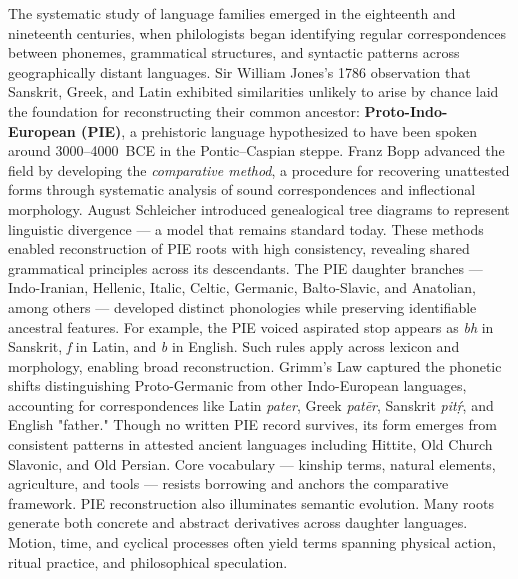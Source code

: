 \begin{historical}
    The systematic study of language families emerged in the eighteenth and nineteenth centuries, when philologists began identifying regular correspondences between phonemes, grammatical structures, and syntactic patterns across geographically distant languages. Sir William Jones's 1786 observation that Sanskrit, Greek, and Latin exhibited similarities unlikely to arise by chance laid the foundation for reconstructing their common ancestor: \textbf{Proto-Indo-European (PIE)}, a prehistoric language hypothesized to have been spoken around 3000–4000~BCE in the Pontic–Caspian steppe.
    Franz Bopp advanced the field by developing the \textit{comparative method}, a procedure for recovering unattested forms through systematic analysis of sound correspondences and inflectional morphology. August Schleicher introduced genealogical tree diagrams to represent linguistic divergence — a model that remains standard today. These methods enabled reconstruction of PIE roots with high consistency, revealing shared grammatical principles across its descendants.
    The PIE daughter branches — Indo-Iranian, Hellenic, Italic, Celtic, Germanic, Balto-Slavic, and Anatolian, among others — developed distinct phonologies while preserving identifiable ancestral features. For example, the PIE voiced aspirated stop  appears as \emph{bh} in Sanskrit, \emph{f} in Latin, and \emph{b} in English. Such rules apply across lexicon and morphology, enabling broad reconstruction. Grimm's Law captured the phonetic shifts distinguishing Proto-Germanic from other Indo-European languages, accounting for correspondences like Latin \emph{pater}, Greek \emph{patēr}, Sanskrit \emph{pitṛ́}, and English "father."
    Though no written PIE record survives, its form emerges from consistent patterns in attested ancient languages including Hittite, Old Church Slavonic, and Old Persian. Core vocabulary — kinship terms, natural elements, agriculture, and tools — resists borrowing and anchors the comparative framework.
    PIE reconstruction also illuminates semantic evolution. Many roots generate both concrete and abstract derivatives across daughter languages. Motion, time, and cyclical processes often yield terms spanning physical action, ritual practice, and philosophical speculation.
\end{historical}